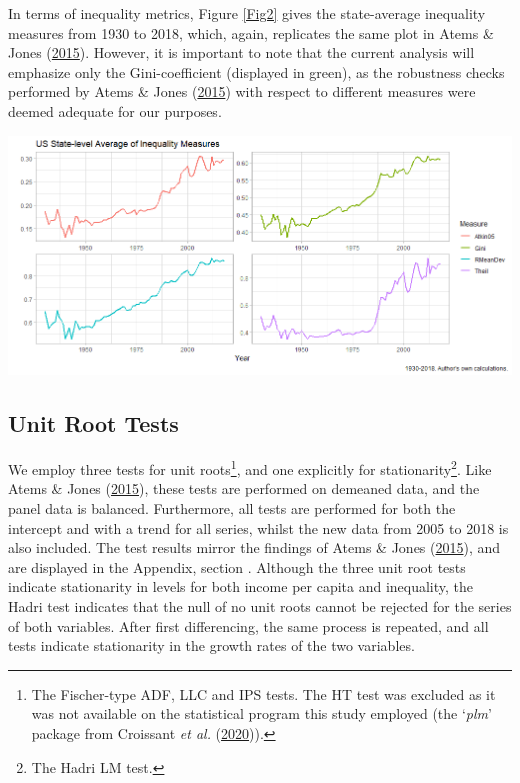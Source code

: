\documentclass[11pt,preprint, authoryear]{elsarticle}
\let\origfigure\figure
\let\endorigfigure\endfigure
\renewenvironment{figure}[1][2] {
    \expandafter\origfigure\expandafter[H]
} {
    \endorigfigure
}
\numberwithin{equation}{section}
\numberwithin{figure}{section}
\numberwithin{table}{section}
\let\rmarkdownfootnote\footnote%
\def\footnote{\protect\rmarkdownfootnote}
\begin{document}
In terms of inequality metrics, Figure \ref{Fig2} gives the
state-average inequality measures from 1930 to 2018, which, again,
replicates the same plot in Atems \& Jones
(\protect\hyperlink{ref-atems}{2015}). However, it is important to note
that the current analysis will emphasize only the Gini-coefficient
(displayed in green), as the robustness checks performed by Atems \&
Jones (\protect\hyperlink{ref-atems}{2015}) with respect to different
measures were deemed adequate for our purposes.

\begin{figure}[H]
\includegraphics[width=1\linewidth]{images/Fig2_Inequality_Measures} \caption{\label{Fig2}}\label{fig:Fig2}
\end{figure}

\hypertarget{unit-root-tests}{%
\subsection{\texorpdfstring{Unit Root Tests
\label{Section 3.2}}{Unit Root Tests }}\label{unit-root-tests}}

We employ three tests for unit roots\footnote{The Fischer-type ADF, LLC
  and IPS tests. The HT test was excluded as it was not available on the
  statistical program this study employed (the `\emph{plm}' package from
  Croissant \emph{et al.}
  (\protect\hyperlink{ref-croissant2020package}{2020})).}, and one
explicitly for stationarity\footnote{The Hadri LM test.}. Like Atems \&
Jones (\protect\hyperlink{ref-atems}{2015}), these tests are performed
on demeaned data, and the panel data is balanced. Furthermore, all tests
are performed for both the intercept and with a trend for all series,
whilst the new data from 2005 to 2018 is also included. The test results
mirror the findings of Atems \& Jones
(\protect\hyperlink{ref-atems}{2015}), and are displayed in the
Appendix, section . Although the three unit root tests indicate
stationarity in levels for both income per capita and inequality, the
Hadri test indicates that the null of no unit roots cannot be rejected
for the series of both variables. After first differencing, the same
process is repeated, and all tests indicate stationarity in the growth
rates of the two variables.
\end{document}
